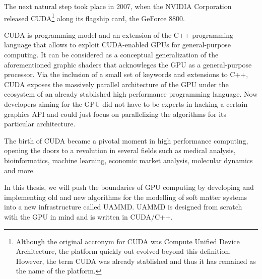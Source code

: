 \documentclass[ twoside,openright,titlepage,numbers=noenddot,%
headinclude,footinclude,cleardoublepage=empty,abstract=on,
BCOR=5mm,paper=a4,fontsize=11pt, dvipsnames
]{scrreprt}
\newcommand{\uammd}{\gls{UAMMD}\xspace}
\newcommand{\gpu}{\gls{GPU}\xspace}
\begin{document}
The next natural step took place in 2007, when the NVIDIA Corporation released CUDA\cite{cuda}\footnote{Although the original accronym for CUDA was Compute Unified Device Architecture, the platform quickly out evolved beyond this definition. However, the term CUDA was already stablished and thus it has remained as the name of the platform.} along its flagship card, the GeForce 8800.

CUDA is programming model and an extension of the C++ programming language that allows to exploit CUDA-enabled \glspl{GPU} for general-purpose computing. It can be considered as a conceptual generalization of the aforementioned graphic shaders that acknowleges the \gpu as a general-purpose processor. Via the inclusion of a small set of keywords and extensions to C++, CUDA exposes the massively parallel architecture of the \gpu under the ecosystem of an already stablished high performance programming language.
Now developers aiming for the \gpu did not have to be experts in hacking a certain graphics \gls{API} and could just focus on parallelizing the algorithms for its particular architecture.

The birth of CUDA became a pivotal moment in high performance computing, opening the doors to a revolution in several fields such as medical analysis, bioinformatics, machine learning, economic market analysis, molecular dynamics and more.

In this thesis, we will push the boundaries of \gpu computing by developing and implementing old and new algorithms for the modelling of soft matter systems into a new infrastructure called \uammd. \uammd is designed from scratch with the \gpu in mind and is written in CUDA/C++.
\end{document}
